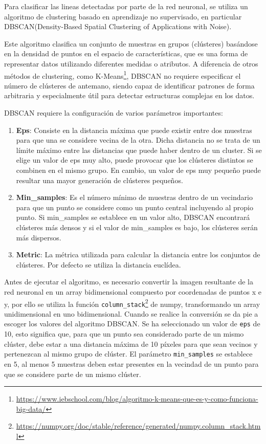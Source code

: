 Para clasificar las lineas detectadas por parte de la red neuronal, se utiliza un algoritmo de clustering basado en aprendizaje no supervisado, en particular
DBSCAN(Density-Based Spatial Clustering of Applications with Noise)\cite{ski_dbs}.\newline

Este algoritmo clasifica un conjunto de muestras en grupos (clústeres) basándose en la densidad de puntos en el espacio de características, que es una forma de representar
datos utilizando diferentes medidas o atributos. A diferencia de otros métodos de clustering, como K-Means\footnote{\url{https://www.iebschool.com/blog/algoritmo-k-means-que-es-y-como-funciona-big-data/}}, 
DBSCAN no requiere especificar el número de clústeres de antemano, 
siendo capaz de identificar patrones de forma arbitraria y especialmente útil para detectar estructuras complejas en los datos. 

DBSCAN requiere la configuración de varios parámetros importantes:
\begin{enumerate}
  \item \textbf{Eps}: Consiste en la distancia máxima que puede existir entre dos muestras para que una se considere vecina de la otra. Dicha distancia no se trata de un límite 
  máximo entre las distancias que puede haber dentro de un cluster. Si se elige un valor de eps muy alto, puede provocar que los clústeres distintos se combinen en el mismo grupo. 
  En cambio, un valor de eps muy pequeño puede resultar una mayor generación de clústeres pequeños.
  \item \textbf{Min\_samples}: Es el número mínimo de muestras dentro de un vecindario para que un punto se considere como un punto central incluyendo al propio punto.
  Si min\_samples se establece en un valor alto, DBSCAN encontrará clústeres más densos y 
  si el valor de min\_samples es bajo, los clústeres serán más dispersos.
  \item \textbf{Metric}: La métrica utilizada para calcular la distancia entre los conjuntos de clústeres. Por defecto se utiliza la distancia euclídea. 
\end{enumerate}

Antes de ejecutar el algoritmo, es necesario convertir la imagen resultante de la red neuronal en un array bidimensional compuesto por coordenadas de puntos x e y, por ello se utiliza
la función \texttt{column\_stack}\footnote{\url{https://numpy.org/doc/stable/reference/generated/numpy.column_stack.html}} de numpy, transformando un array
unidimensional en uno bidimensional. Cuando se realice la conversión se da pie a escoger los valores del algoritmo DBSCAN. Se ha seleccionado un valor de \texttt{eps} de 10, esto significa que, 
para que un punto sea considerado parte de un mismo clúster, debe estar a una distancia máxima de 10 píxeles para que sean vecinos y pertenezcan al mismo grupo de clúster. 
El parámetro \texttt{min\_samples} se establece en 5, al menos 5 muestras 
deben estar presentes en la vecindad de un punto para que se considere parte de un mismo clúster. 

